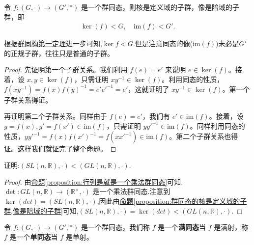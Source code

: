 \documentclass[../../main.tex]{subfiles}
\begin{document}
\begin{proposition}\label{proposition:群同态的核是定义域的子群,像是陪域的子群}
令 $f:(G,\cdot)\to (G',*)$ 是一个群同态，则核是定义域的子群，像是陪域的子群，即
\begin{align*}
\ker(f) < G,\quad
\mathrm{im}(f) < G'.
\end{align*}
\end{proposition}
\begin{remark}
根据\hyperref[theorem:群同构第一定理]{群同构第一定理}进一步可知,$\ker f \lhd G$.但是注意同态的像($\mathrm{im}(f)$)未必是$G'$的正规子群，往往只是普通的子群。
\end{remark}
\begin{proof}
先证明第一个子群关系。我们利用 $f(e)=e'$ 来说明 $e\in\ker(f)$。接着，设 $x,y\in\ker(f)$，只需证明 $xy^{-1}\in\ker(f)$。利用同态的性质，$f(xy^{-1}) = f(x)f(y)^{-1}=e'e'^{-1}=e'$，这就证明了 $xy^{-1}\in\ker(f)$。第一个子群关系得证。

再证明第二个子群关系。同样由于 $f(e)=e'$，我们有 $e'\in\mathrm{im}(f)$。接着，设 $y = f(x),y' = f(x')\in\mathrm{im}(f)$，只需证明 $yy'^{-1}\in\mathrm{im}(f)$。同样利用同态的性质，$yy'^{-1}=f(x)f(x')^{-1}=f(xx'^{-1})\in\mathrm{im}(f)$。第二个子群关系也得证。这样我们就证完了整个命题。

\end{proof}

\begin{example}
证明:$(SL(n,\mathbb{R}),\cdot)<(GL(n,\mathbb{R}),\cdot)$.
\end{example}
\begin{proof}
由\hyperref[proposition:行列是就是一个乘法群同态]{命题\ref{proposition:行列是就是一个乘法群同态}}可知,$\det : GL(n, \mathbb{R}) \to (\mathbb{R}^\times, \cdot)$ 是一个乘法群同态.注意到$\ker (det)=(SL(n,\mathbb{R}),\cdot)$,因此由\hyperref[proposition:群同态的核是定义域的子群,像是陪域的子群]{命题\ref{proposition:群同态的核是定义域的子群,像是陪域的子群}}可知,$(SL(n,\mathbb{R}),\cdot)=\ker (det)<(GL(n,\mathbb{R}),\cdot)$.

\end{proof}

\begin{definition}[满同态与单同态]
令 $f:(G,\cdot)\to (G',*)$ 是一个群同态，我们称 $f$ 是一个\textbf{满同态}当 $f$ 是满射，称 $f$ 是一个\textbf{单同态}当 $f$ 是单射。 
\end{definition}
\end{document}
